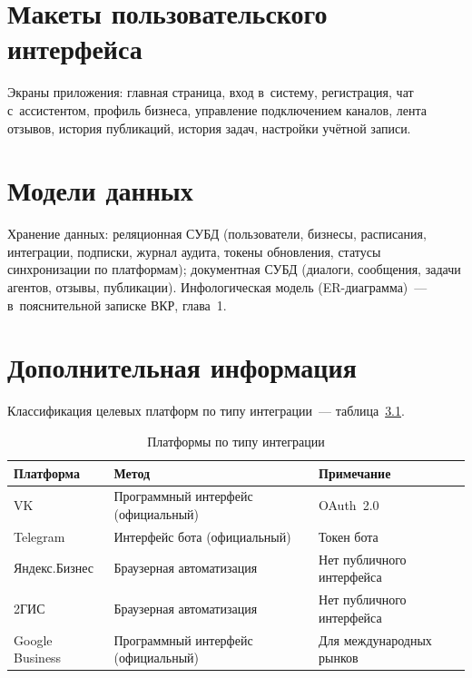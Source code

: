 
\chapter{Макеты пользовательского интерфейса}
\label{app:ui}

Экраны приложения: главная страница, вход в~систему, регистрация, чат с~ассистентом, профиль бизнеса, управление подключением каналов, лента отзывов, история публикаций, история задач, настройки учётной записи.

\chapter{Модели данных}
\label{app:data-model}

Хранение данных: реляционная СУБД (пользователи, бизнесы, расписания, интеграции, подписки, журнал аудита, токены обновления, статусы синхронизации по платформам); документная СУБД (диалоги, сообщения, задачи агентов, отзывы, публикации). Инфологическая модель (ER-диаграмма)~--- в~пояснительной записке ВКР, глава~1.

\chapter{Дополнительная информация}
\label{app:extra}

Классификация целевых платформ по типу интеграции~--- таблица~\ref{tab:platform-class}.

\begin{table}[H]
  \caption{Платформы по типу интеграции}
  \label{tab:platform-class}
  \small
  \begin{tabularx}{\textwidth}{|p{3cm}|p{3.5cm}|X|}
    \hline
    \textbf{Платформа} & \textbf{Метод} & \textbf{Примечание} \\
    \hline
    VK & Программный интерфейс (официальный) & OAuth~2.0 \\
    Telegram & Интерфейс бота (официальный) & Токен бота \\
    Яндекс.Бизнес & Браузерная автоматизация & Нет публичного интерфейса \\
    2ГИС & Браузерная автоматизация & Нет публичного интерфейса \\
    Google Business & Программный интерфейс (официальный) & Для международных рынков \\
    \hline
  \end{tabularx}
\end{table}
